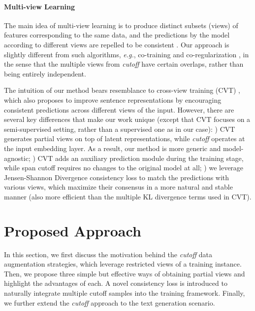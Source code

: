 \documentclass[11pt,a4paper]{article}
\begin{document}
\nocite{Chen2020MixTextLI}

\vspace{-2mm}
\paragraph{Multi-view Learning}
The main idea of multi-view learning is to produce distinct subsets (views) of features corresponding to the same data, and the predictions by the model according to different views are repelled to be consistent \cite{Xu2013ASO}. Our approach is slightly different from such algorithms, \emph{e.g.}, co-training \cite{Blum1998CombiningLA} and co-regularization \cite{sindhwani2005co}, in the sense that the multiple views from \emph{cutoff} have certain overlaps, rather than being entirely independent. 

The intuition of our method bears resemblance to cross-view training (CVT) \cite{Clark2018SemiSupervisedSM}, which also proposes to improve sentence representations by encouraging consistent predictions across different views of the input. However, there are several key differences that make our work unique (except that CVT focuses on a  semi-supervised setting, rather than a supervised one as in our case):
\emph{}) CVT generates partial views on top of latent representations, while \emph{cutoff} operates at the input embedding layer. As a result, our method is more generic and model-agnostic;
\emph{}) CVT adds an auxiliary prediction module during the training stage, while span cutoff requires no changes to the original model at all;
\emph{}) we leverage Jensen-Shannon Divergence consistency loss to match the predictions with various views, which maximize their consensus in a more natural and stable manner (also more efficient than the multiple KL divergence terms used in CVT). 
\vspace{-1mm}
\section{Proposed Approach}
\vspace{-1mm}
In this section, we first discuss the motivation behind the \emph{cutoff} data augmentation strategies, which leverage restricted views of a training instance. Then, we propose three simple but effective ways of obtaining partial views and highlight the advantages of each. A novel consistency loss is introduced to naturally integrate multiple cutoff samples into the training framework. Finally, we further extend the \emph{cutoff} approach to the text generation scenario.  
\end{document}
